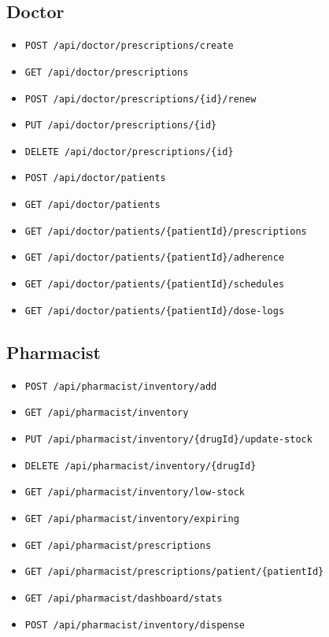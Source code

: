 \documentclass[12pt,a4paper]{article}
\begin{document}
\subsection{Doctor}
\begin{itemize}[leftmargin=*]
  \item \texttt{POST /api/doctor/prescriptions/create}
  \item \texttt{GET /api/doctor/prescriptions}
  \item \texttt{POST /api/doctor/prescriptions/\{id\}/renew}
  \item \texttt{PUT /api/doctor/prescriptions/\{id\}}
  \item \texttt{DELETE /api/doctor/prescriptions/\{id\}}
  \item \texttt{POST /api/doctor/patients}
  \item \texttt{GET /api/doctor/patients}
  \item \texttt{GET /api/doctor/patients/\{patientId\}/prescriptions}
  \item \texttt{GET /api/doctor/patients/\{patientId\}/adherence}
  \item \texttt{GET /api/doctor/patients/\{patientId\}/schedules}
  \item \texttt{GET /api/doctor/patients/\{patientId\}/dose-logs}
\end{itemize}

\subsection{Pharmacist}
\begin{itemize}[leftmargin=*]
  \item \texttt{POST /api/pharmacist/inventory/add}
  \item \texttt{GET /api/pharmacist/inventory}
  \item \texttt{PUT /api/pharmacist/inventory/\{drugId\}/update-stock}
  \item \texttt{DELETE /api/pharmacist/inventory/\{drugId\}}
  \item \texttt{GET /api/pharmacist/inventory/low-stock}
  \item \texttt{GET /api/pharmacist/inventory/expiring}
  \item \texttt{GET /api/pharmacist/prescriptions}
  \item \texttt{GET /api/pharmacist/prescriptions/patient/\{patientId\}}
  \item \texttt{GET /api/pharmacist/dashboard/stats}
  \item \texttt{POST /api/pharmacist/inventory/dispense}
\end{itemize}
\end{document}
